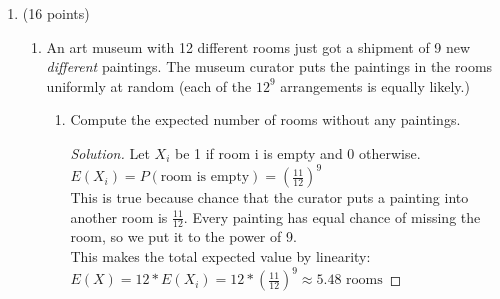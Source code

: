 \documentclass[10pt,letterpaper,unboxed,cm]{article}
\newenvironment{solution}
  {\begin{proof}[Solution]}
  {\end{proof}}
\begin{document}
\begin{enumerate}
\begin{enumerate}
\item
Compute the expected number of swaps (A swap is a pair of elements $(a_i,a_j)$ such that $a_i=j$ and $a_j=i$ and $i<j$.)

\begin{solution}
    Let $X_{ij}$ be 1 if $a_i = j \text{ and } a_j = i$, 0 otherwise.\\
    To find the probability of $X_{ij}$ we can split it into two probabilities:\\
    \(P(a_i = j) = \frac{1}{n} \hspace{2cm} P(a_j = i | a_i = j) = \frac{1}{n-1}\)\\
    n-1 comes from the fact that the first number is already chosen: $a_i$.\\
    The combined probability is then:\\
    \(P(a_i = j \text{ and } a_j = i) = P(a_i = j) * P(a_j = i | a_i = j) = \frac{1}{n} * \frac{1}{n-1} = \frac{1}{n(n-1)}\)\\
    The total expected value then becomes:\\
    \(\sum_{i<j} E(X_{ij}) = \binom{n}{2} * \frac{1}{n(n-1)} = \frac{n!}{(n-2)!2!} * \frac{1}{n(n-1)} = \frac{n(n-1)(n-2)!}{(n-2)!2!} * \frac{1}{n(n-1)} = \frac{n(n-1)}{2*n(n-1)} = \boxed{\frac{1}{2}}\)\\
   $\binom{n}{2}$ comes from number of pairs we can make with n numbers. 
\end{solution}

\end{enumerate}



\item (16 points)
\begin{enumerate}
\item
An art museum with 12 different rooms just got a shipment of 9 new \emph{different} paintings. The museum curator puts the paintings in the rooms uniformly at random (each of the $12^9$ arrangements is equally likely.)

\begin{enumerate}
\item
Compute the expected number of rooms without any paintings.

\begin{solution}
    Let $X_i$ be 1 if room i is empty and 0 otherwise.\\
    \(E(X_i) = P(\text{room is empty}) = (\frac{11}{12})^9\)\\
    This is true because chance that the curator puts a painting into another room is $\frac{11}{12}$. Every painting has equal chance of missing the room, so we put it to the power of 9.\\
    This makes the total expected value by linearity:\\
    \(E(X) = 12 * E(X_i) = 12 * (\frac{11}{12})^9 \approx \boxed{5.48 \text{ rooms}}\)
\end{solution}


\end{enumerate}
\end{enumerate}
\end{enumerate}
\end{document}
